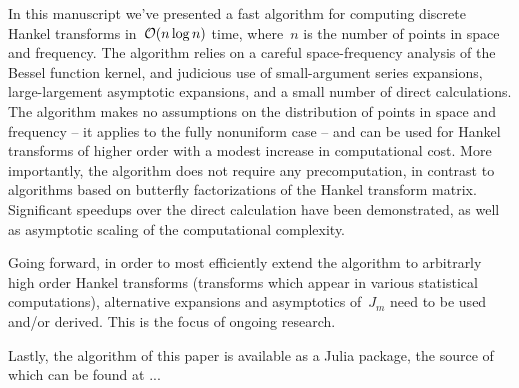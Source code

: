 
In this manuscript we've presented a fast algorithm for computing discrete
Hankel transforms in~$\mathcal{O}(n \log n)$ time, where~$n$ is the number of
points in space and frequency. The algorithm relies on a careful space-frequency
analysis of the Bessel function kernel, and judicious use of small-argument
series expansions, large-largement asymptotic expansions, and a small number of
direct calculations. The algorithm makes no assumptions on the distribution of
points in space and frequency -- it applies to the fully nonuniform case -- and
can be used for Hankel transforms of higher order with a modest increase in
computational cost. More importantly, the algorithm does not require any
precomputation, in contrast to algorithms based on butterfly factorizations of
the Hankel transform matrix. Significant speedups over the direct calculation
have been demonstrated, as well as asymptotic scaling of the computational
complexity.

Going forward, in order to most efficiently extend the algorithm to arbitrarly
high order Hankel transforms (transforms which appear in various statistical
computations), alternative expansions and asymptotics of~$J_m$ need to be used
and/or derived. This is the focus of ongoing research.

Lastly, the algorithm of this paper is available {\color{red} as a Julia
  package, the source of which can be found at ... }



